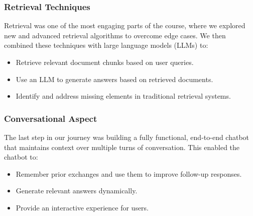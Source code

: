 \documentclass{article}
\begin{document}
\subsubsection{Retrieval Techniques}

Retrieval was one of the most engaging parts of the course, where we explored new and advanced retrieval algorithms to overcome edge cases. We then combined these techniques with large language models (LLMs) to:

\begin{itemize}
    \item Retrieve relevant document chunks based on user queries.
    \item Use an LLM to generate answers based on retrieved documents.
    \item Identify and address missing elements in traditional retrieval systems.
\end{itemize}

\subsubsection{Conversational Aspect}

The last step in our journey was building a fully functional, end-to-end chatbot that maintains context over multiple turns of conversation. This enabled the chatbot to:

\begin{itemize}
    \item Remember prior exchanges and use them to improve follow-up responses.
    \item Generate relevant answers dynamically.
    \item Provide an interactive experience for users.
\end{itemize}



\end{document}
